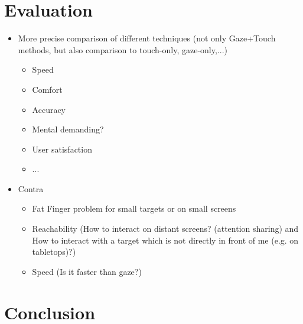 \documentclass{sigchi}
\begin{document}
\section{Evaluation}
\begin{itemize}
  \item More precise comparison of different techniques (not only Gaze+Touch methods, but also comparison to touch-only, gaze-only,...)
  \begin{itemize}
    \item Speed
    \item Comfort
    \item Accuracy
    \item Mental demanding?
    \item User satisfaction 
    \item ... 
  \end{itemize}
  \item Contra
  \begin{itemize}
    \item Fat Finger problem for small targets or on small screens
    \item Reachability (How to interact on distant screens? (attention sharing) and How to interact with a target which is not directly in front of me (e.g. on tabletops)?)
    \item Speed (Is it faster than gaze?)
  \end{itemize}
 \end{itemize}
\section{Conclusion}






\end{document}
